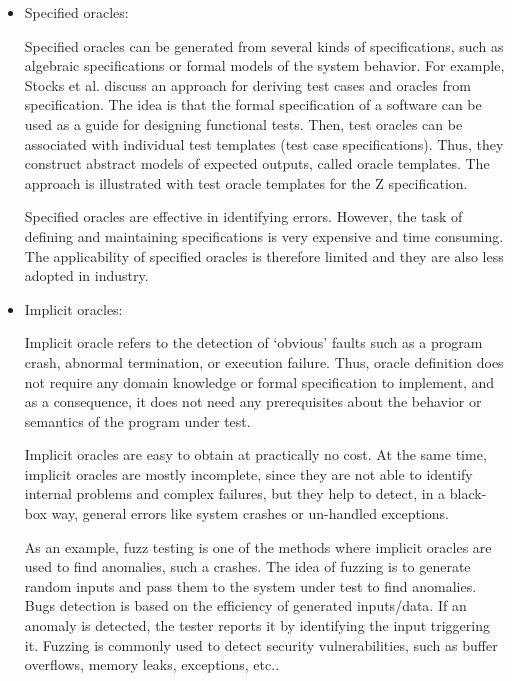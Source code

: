 \begin{itemize}
	\item Specified oracles:
	
	Specified oracles can be generated from several kinds of specifications, such as algebraic specifications or formal models of the system behavior. 
	For example, Stocks et al.\cite{stocks1996framework,richardson1992specification} discuss an approach for deriving test cases and oracles from specification. The idea is that the formal specification of a software can be used as a guide for designing functional tests. Then, test oracles can be associated with individual test templates (test case specifications). Thus, they construct abstract models of expected outputs, called oracle templates. 
	The approach is illustrated with test oracle templates for the Z specification.
	
	Specified oracles are effective in identifying errors. However, the task of defining and maintaining specifications is very expensive and time consuming. The applicability of specified oracles is therefore limited and they are also less adopted in industry.
	
	\item Implicit oracles:
	
	Implicit oracle refers to the detection of ‘obvious’ faults such as a program crash, abnormal termination, or execution failure.
	Thus, oracle definition does not require any domain knowledge or formal specification to implement, and as a consequence, it does not need any prerequisites about the behavior or semantics of the program under test.
	
	Implicit oracles\cite{harman2013comprehensive,barr2015oracle} are easy to obtain at practically no cost. At the same time, implicit oracles are mostly incomplete, since they are not able to identify internal problems and complex failures, but they help to detect, in a black-box way, general errors like system crashes or un-handled exceptions.
	
	As an example, fuzz testing\cite{miller1990empirical} is one of the methods where implicit oracles are used to find anomalies, such a crashes. The idea of fuzzing is to generate random inputs and pass them to the system under test to find anomalies.
	Bugs detection is based on the efficiency of generated inputs/data. If an anomaly is detected, the tester reports it by identifying the input triggering it. 
	Fuzzing is commonly used to detect security vulnerabilities, such as buffer overflows, memory leaks, exceptions, etc.\cite{bekrar2011finding}.
	

\end{itemize}
